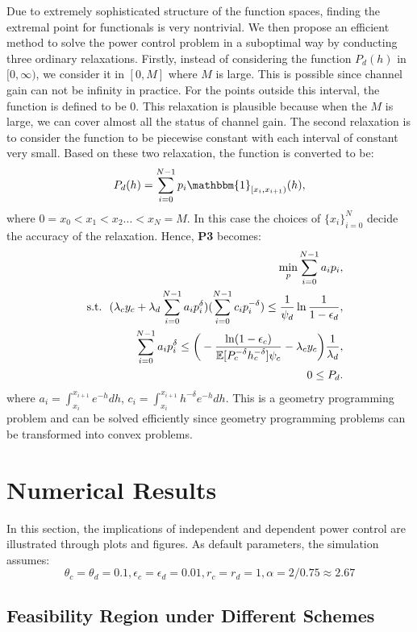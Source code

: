 \documentclass[12pt, draftclsnofoot, journal, letterpaper, onecolumn]{IEEEtran}
\begin{document}
Due to extremely sophisticated structure of the function spaces, finding the extremal point for functionals is very nontrivial. We then propose an efficient method to solve the power control problem in a suboptimal way by conducting three ordinary relaxations. Firstly, instead of considering the function $P_d(h)$ in $[0,\infty)$, we consider it in $[0,M]$ where $M$ is large. This is possible since channel gain can not be infinity in practice. For the points outside this interval, the function is defined to be $0$. This relaxation is plausible because when the $M$ is large, we can cover almost all the status of channel gain. The second relaxation is to consider the function to be piecewise constant with each interval of constant very small. Based on these two relaxation, the function is converted to be:
\begin{equation*}
P_d(h)=\sum_{i=0}^{N-1}p_i\mathbbm{1}_{[x_i,x_{i+1})}(h),
\end{equation*}
where $0=x_0<x_1<x_2...<x_N=M$. In this case the choices of $\{x_i\}_{i=0}^N$ decide the accuracy of the relaxation.
Hence, \textbf{P3} becomes:
\begin{eqnarray}
&& \min_p\sum_{i=0}^{N-1}a_ip_i, \\
&&{\rm s.t.}~~ (\lambda_cy_c+\lambda_d\sum_{i=0}^{N-1}a_ip_i^\delta)(\sum_{i=0}^{N-1}c_ip_i^{-\delta})\leq\frac{1}{\psi_d}\ln\frac{1}{1-\epsilon_d},\\
&& ~~~~~~~\sum_{i=0}^{N-1}a_ip_i^\delta\leq \bigg(-\frac{\ln(1-\epsilon_c)}{\mathbb{E}[P_c^{-\delta}h_c^{-\delta}]\psi_c}-\lambda_cy_c\bigg)\frac{1}{\lambda_d},\\
&& ~~~~~~~0\leq P_ d.
\end{eqnarray}
where $a_i=\int_{x_i}^{x_{i+1}}e^{-h}dh$, $c_i=\int_{x_i}^{x_{i+1}}h^{-\delta}e^{-h}dh$. This is a geometry programming problem and can be solved efficiently since geometry programming problems can be transformed into convex problems.
\section{Numerical Results}
In this section, the implications of independent and dependent power control are illustrated through plots and figures. As default parameters, the simulation assumes:
\begin{equation*}
\theta_c=\theta_d=0.1, \epsilon_c=\epsilon_d=0.01, r_c=r_d=1, \alpha=2/0.75\approx2.67
\end{equation*}
\subsection{Feasibility Region under Different Schemes}
\end{document}
